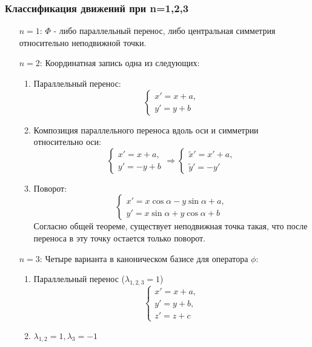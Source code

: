 \subsubsection*{Классификация движений при n=1,2,3}
\begin{itemize}
    \item[$n=1$:] $\Phi$ - либо параллельный перенос, либо центральная симметрия относительно неподвижной точки.
    \item[$n=2$:] Координатная запись одна из следующих:
    \begin{enumerate}
        \item Параллельный перенос:
        \[\begin{cases}
            x'=x+a,\\
            y'=y+b
        \end{cases}
        \]
        \item Композиция параллельного переноса вдоль оси и симметрии относительно оси:
        \[
        \begin{cases}
            x'=x+a,\\
            y'=-y+b
        \end{cases} \Longrightarrow
        \begin{cases}
            \widetilde{x}'=x'+a,\\
            \widetilde{y}'=-y'
        \end{cases}
        \] 
        \item Поворот:
        \[
        \begin{cases}
            x'=x\cos{\alpha}-y\sin{\alpha}+a,\\
            y'=x\sin{\alpha}+y\cos{\alpha}+b
        \end{cases}
        \]
        Согласно общей теореме, существует неподвижная точка такая, что после переноса в эту точку остается только поворот.
    \end{enumerate}
    \item[$n=3$:] Четыре варианта в каноническом базисе для оператора $\phi$:
    \begin{enumerate}
        \item Параллельный перенос ($\lambda_{1,2,3}=1$)
        \[
        \begin{cases}
            x'=x+a,\\
            y'=y+b,\\
            z'=z+c
        \end{cases}
        \]
        \item $\lambda_{1,2}=1, \lambda_3=-1$

\end{enumerate}
\end{itemize}
